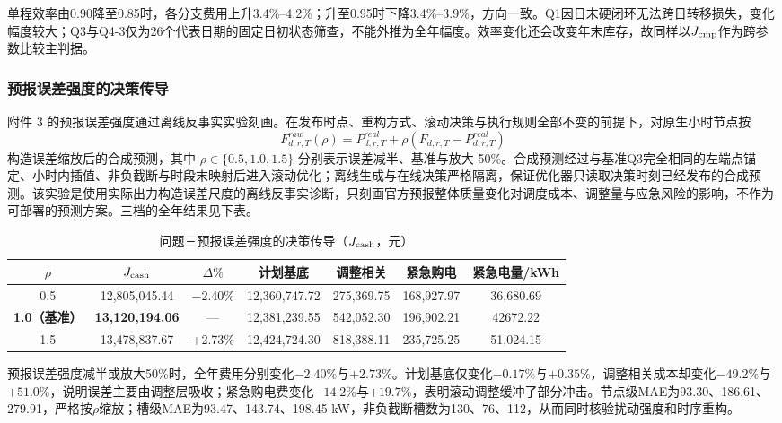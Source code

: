 \documentclass[withoutpreface,bwprint]{cumcmthesis}
\begin{document}
单程效率由0.90降至0.85时，各分支费用上升3.4\%--4.2\%；升至0.95时下降3.4\%--3.9\%，方向一致。Q1因日末硬闭环无法跨日转移损失，变化幅度较大；Q3与Q4-3仅为26个代表日期的固定日初状态筛查，不能外推为全年幅度。效率变化还会改变年末库存，故同样以\(J_{\rm cmp}\)作为跨参数比较主判据。
\subsubsection{预报误差强度的决策传导}

附件 3 的预报误差强度通过离线反事实实验刻画。在发布时点、重构方式、滚动决策与执行规则全部不变的前提下，对原生小时节点按
\begin{equation}
F^{raw}_{d,r,T}(\rho)=P^{real}_{d,r,T}+\rho\left(F_{d,r,T}-P^{real}_{d,r,T}\right)
\end{equation}
构造误差缩放后的合成预测，其中 \(\rho\in\{0.5,1.0,1.5\}\) 分别表示误差减半、基准与放大 50\%。合成预测经过与基准Q3完全相同的左端点锚定、小时内插值、非负截断与时段末映射后进入滚动优化；离线生成与在线决策严格隔离，保证优化器只读取决策时刻已经发布的合成预测。该实验是使用实际出力构造误差尺度的离线反事实诊断，只刻画官方预报整体质量变化对调度成本、调整量与应急风险的影响，不作为可部署的预测方案。三档的全年结果见下表。

\begin{table}[!htbp]
\centering
\caption{问题三预报误差强度的决策传导（\(J_{\rm cash}\)，元）}
\footnotesize
\begin{tabular}{|c|c|c|c|c|c|c|}
\hline
\(\rho\) & \(J_{\rm cash}\) & \(\Delta\%\) & 计划基底 & 调整相关 & 紧急购电 & 紧急电量/kWh \\
\hline
0.5 & 12,805,045.44 & $-$2.40\% & 12,360,747.72 & 275,369.75 & 168,927.97 & 36,680.69 \\
\hline
\textbf{1.0（基准）} & \textbf{13,120,194.06} & --- & 12,381,239.55 & 542,052.30 & 196,902.21 & 42672.22 \\
\hline
1.5 & 13,478,837.67 & +2.73\% & 12,424,724.30 & 818,388.11 & 235,725.25 & 51,024.15 \\
\hline
\end{tabular}
\end{table}

预报误差强度减半或放大50\%时，全年费用分别变化\(-2.40\%\)与\(+2.73\%\)。计划基底仅变化\(-0.17\%\)与\(+0.35\%\)，调整相关成本却变化\(-49.2\%\)与\(+51.0\%\)，说明误差主要由调整层吸收；紧急购电费变化\(-14.2\%\)与\(+19.7\%\)，表明滚动调整缓冲了部分冲击。节点级MAE为93.30、186.61、279.91，严格按\(\rho\)缩放；槽级MAE为93.47、143.74、198.45 kW，非负截断槽数为130、76、112，从而同时核验扰动强度和时序重构。
\end{document}
